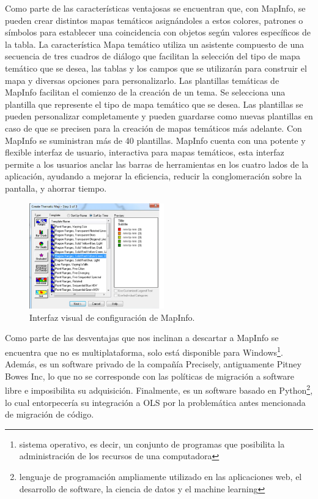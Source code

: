 Como parte de las caracter\'isticas ventajosas se encuentran que, con MapInfo, se pueden crear distintos mapas tem\'aticos asign\'andoles a estos colores, patrones o s\'imbolos para establecer una coincidencia con objetos seg\'un valores espec\'ificos de la tabla. La caracter\'istica Mapa tem\'atico utiliza un asistente compuesto de una secuencia de tres cuadros de di\'alogo que facilitan la selecci\'on del tipo de mapa tem\'atico que se desea, las tablas y los campos que se utilizar\'an para construir el mapa y diversas opciones para personalizarlo. Las plantillas tem\'aticas de MapInfo facilitan el comienzo de la creaci\'on de un tema. Se selecciona una plantilla que represente el tipo de mapa tem\'atico que se desea. Las plantillas se pueden personalizar completamente y pueden guardarse como nuevas plantillas en caso de que se precisen para la creaci\'on de mapas tem\'aticos m\'as adelante. Con MapInfo se suministran m\'as de 40 plantillas. MapInfo cuenta con una potente y flexible interfaz de usuario, interactiva para mapas tem\'aticos, esta interfaz permite a los usuarios anclar las barras de herramientas en los cuatro lados de la aplicaci\'on, ayudando a mejorar la eficiencia, reducir la conglomeraci\'on sobre la pantalla, y ahorrar tiempo. \cite{mapinfo}

\begin{figure}
\vspace{-20pt}
\begin{center}
\includegraphics[width=0.52\textwidth]{images/mapInfoUi.png} 
\end{center} \vspace{-20pt} \caption{Interfaz visual de configuraci\'on de MapInfo.}  \label{mapinfo2} \vspace{-10pt} 
\end{figure}

Como parte de las desventajas que nos inclinan a descartar a MapInfo se encuentra que no es multiplataforma, solo est\'a disponible para Windows\footnote{sistema operativo, es decir, un conjunto de programas que posibilita la administraci\'on de los recursos de una computadora}. Adem\'as, es un software privado de la compa\~n\'ia Precisely, antiguamente Pitney Bowes Inc, lo que no se corresponde con las pol\'iticas de migraci\'on a software libre e imposibilita su adquisici\'on. Finalmente, es un software basado en Python\footnote{lenguaje de programaci\'on ampliamente utilizado en las aplicaciones web, el desarrollo de software, la ciencia de datos y el machine learning}, lo cual entorpecer\'ia su integraci\'on a OLS por la problem\'atica antes mencionada de migraci\'on de c\'odigo.


